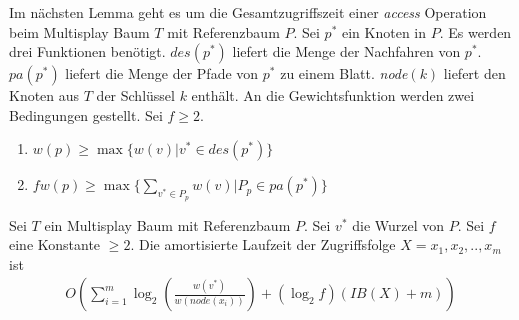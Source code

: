 \documentclass[a4paper,12pt]{article}
\begin{document}
\noindent Im nächsten Lemma geht es um die Gesamtzugriffszeit einer \textit{access} Operation beim Multisplay Baum $T$ mit Referenzbaum $P$. Sei $p^*$ ein Knoten in $P$. Es werden drei Funktionen benötigt. $\mathit{des}\left(p^*\right)$ liefert die Menge der Nachfahren von $p^*$.  $\mathit{pa}\left(p^*\right)$ liefert die Menge der Pfade von $p^*$ zu einem Blatt. \textit{node}$\left(k\right)$ liefert den Knoten aus $T$ der Schlüssel $k$ enthält. An die Gewichtsfunktion werden zwei Bedingungen gestellt. Sei $f \geq 2$.
\begin{enumerate}
	\item $w\left(p\right) \geq \max \{  w\left(v\right)\vert  v^*
	\in\mathit{des}\left(p^*\right)  \}$
	\item $f  w\left(p\right) \geq    \max \{  \sum_{v^* \in P_p }  w\left(v\right)\vert    P_p \in \mathit{pa}\left(p^*\right) \}  $
\end{enumerate}
\begin{Lemma2}
	Sei $T$ ein Multisplay Baum mit Referenzbaum $P$. Sei $v^*$ die Wurzel von $P$. Sei $f$ eine Konstante $\geq 2$. Die amortisierte Laufzeit der Zugriffsfolge $X = x_1, x_2,..,x_m$ ist 
\begin{align*}
O\left(  \sum_{i = 1}^{m} \log_2\left(   \frac{w\left(v^*\right)}{w\left(\textit{node}\left(x_i\right)\right)}  \right)  
+ \left(\log_2 f\right) \left(\mathit{IB}\left(X\right) + m\right) \right)
\end{align*}
\end{Lemma2}
\end{document}
